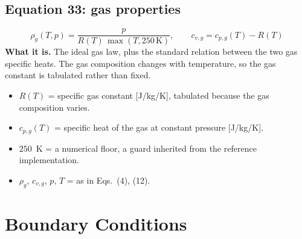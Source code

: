 \documentclass[11pt]{article}
\begin{document}
\subsection*{Equation 33: gas properties}
\begin{equation}
\rho_g(T, p) = \frac{p}{R(T)\,\max(T, 250\,\mathrm{K})},
\qquad
c_{v,g} = c_{p,g}(T) - R(T)
\end{equation}
\textbf{What it is.} The ideal gas law, plus the standard relation between the
two gas specific heats. The gas composition changes with temperature, so the gas
constant is tabulated rather than fixed.
\begin{itemize}
  \item $R(T)$ = specific gas constant [J/kg/K], tabulated because the gas
        composition varies.
  \item $c_{p,g}(T)$ = specific heat of the gas at constant pressure [J/kg/K].
  \item $250$~K = a numerical floor, a guard inherited from the reference
        implementation.
  \item $\rho_g$, $c_{v,g}$, $p$, $T$ = as in Eqs.~(4), (12).
\end{itemize}

\section{Boundary Conditions}
\end{document}
